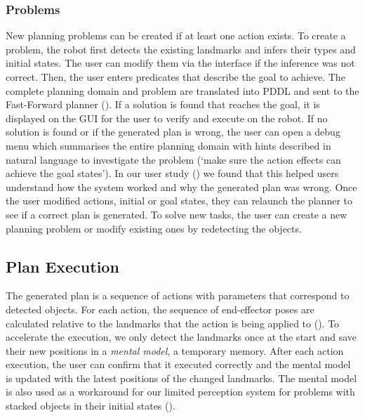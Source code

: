 \subsubsection*{Problems} New planning problems can be created if at least one action exists.
To create a problem, the robot first detects the existing landmarks and infers their types and initial states.
The user can modify them via the interface if the inference was not correct.
Then, the user enters predicates that describe the goal to achieve.
The complete planning domain and problem are translated into PDDL and sent to the Fast-Forward planner (\cite{hoffmann2001ff}).
If a solution is found that reaches the goal, it is displayed on the GUI for the user to verify and execute on the robot.
If no solution is found or if the generated plan is wrong, the user can open a debug menu which summarises the entire planning domain with hints described in natural language to investigate the problem (\eg `make sure the action effects can achieve the goal states').
In our user study () we found that this helped users understand how the system worked and why the generated plan was wrong.
Once the user modified actions, initial or goal states, they can relaunch the planner to see if a correct plan is generated.
To solve new tasks, the user can create a new planning problem or modify existing ones by redetecting the objects.


\subsection{Plan Execution} 
The generated plan is a sequence of actions with parameters that correspond to detected objects.
For each action, the sequence of end-effector poses are calculated relative to the landmarks that the action is being applied to ().
To accelerate the execution, we only detect the landmarks once at the start and save their new positions in a \textit{mental model}, \ie a temporary memory.
After each action execution, the user can confirm that it executed correctly and the mental model is updated with the latest positions of the changed landmarks.
The mental model is also used as a workaround for our limited perception system for problems with stacked objects in their initial states ().


